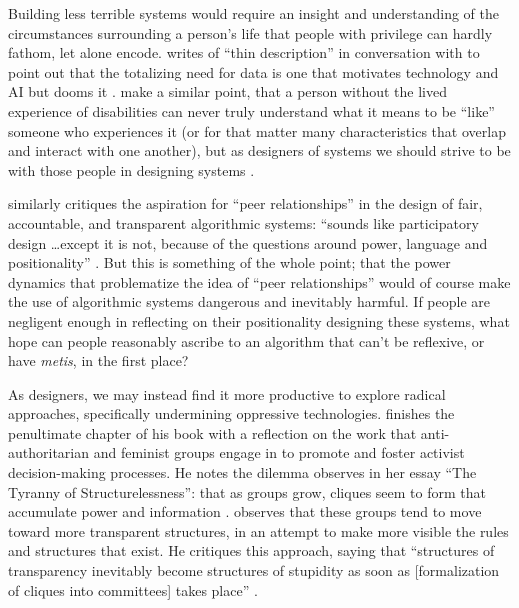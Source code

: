 \documentclass[manuscript,screen]{acmart}
\begin{document}
Building less terrible systems would require an insight and understanding of the circumstances surrounding a person's life that people with privilege can hardly fathom, let alone encode.
\citeauthor{benjamin2019race} writes of ``thin description'' in conversation with \citeauthor{jackson2013thin} to point out that the totalizing need for data is one that motivates technology and AI but dooms it
\cite{benjamin2019race}.
\citeauthor{10.1145/3290605.3300528} make a similar point, that a person without the lived experience of disabilities can never truly understand what it means to be ``like'' someone who experiences it (or for that matter many characteristics that overlap and interact with one another), but as designers of systems we should strive to be with those people in designing systems
\cite{10.1145/3290605.3300528}.

\citeauthor{fatBeWilin} similarly critiques the aspiration for ``peer relationships'' in the design of fair, accountable, and transparent algorithmic systems: ``sounds like participatory design \dots except it is not, because of the questions around power, language and positionality''
\cite{fatBeWilin}.
But this is something of the whole point;
that the power dynamics that problematize the idea of ``peer relationships'' would of course make the use of algorithmic systems dangerous and inevitably harmful.
If people are negligent enough in reflecting on their positionality designing these systems, what hope can people reasonably ascribe to an algorithm that can't be reflexive, or have \emph{metis}, in the first place?

As designers, we may instead find it more productive to explore radical approaches, specifically undermining oppressive technologies.
\citeauthor{graeber2015utopia} finishes the penultimate chapter of his book with a reflection on the work that anti-authoritarian and feminist groups engage in to promote and foster activist decision-making processes.
He notes the dilemma \citeauthor{freeman1972tyranny} observes in her essay ``The Tyranny of Structurelessness'': that as groups grow, cliques seem to form that accumulate power and information
\cite{freeman1972tyranny}.
\citeauthor{graeber2015utopia} observes that these groups tend to move toward more transparent structures, in an attempt to make more visible the rules and structures that exist.
He critiques this approach, saying that ``structures of transparency inevitably become structures of stupidity as soon as [formalization of cliques into committees] takes place''
\cite{graeber2015utopia}.
\end{document}
